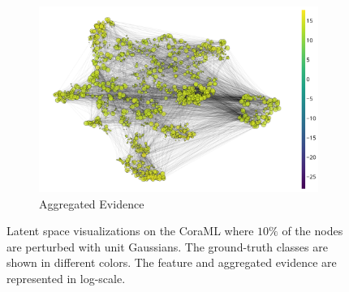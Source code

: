 \begin{figure}[!h]
	\begin{subfigure}[t]{\textwidth}
	    \centering
		\includegraphics[height=0.25\textheight]{resources/gaussian-evidence.png}
		\caption{Aggregated Evidence}
		\label{subfig:gaussian-clean-evidence}
	\end{subfigure}
    \caption{Latent space visualizations on the CoraML where $10\%$ of the nodes are perturbed with unit Gaussians. The ground-truth classes are shown in different colors. The feature and aggregated evidence are represented in log-scale.}
    \label{fig:latent-space-gaussian}
\end{figure}
%
